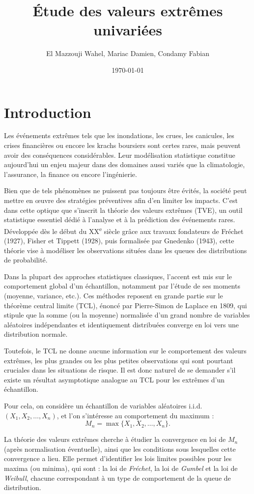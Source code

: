 \documentclass{article}
\title{Étude des valeurs extrêmes univariées}
\author{El Mazzouji Wahel, Mariac Damien, Condamy Fabian}
\date{\today}
\theoremstyle{plain}
\theoremstyle{definition}
\theoremstyle{plain}
\begin{document}
\maketitle 
\newpage
\tableofcontents 
\newpage
\section{Introduction}

Les événements extrêmes tels que les inondations, les crues, les canicules, les crises financières ou encore les krachs boursiers sont certes rares, mais peuvent avoir des conséquences considérables. Leur modélisation statistique constitue aujourd’hui un enjeu majeur dans des domaines aussi variés que la climatologie, l’assurance, la finance ou encore l’ingénierie.

Bien que de tels phénomènes ne puissent pas toujours être évités, la société peut mettre en œuvre des stratégies préventives afin d’en limiter les impacts. C’est dans cette optique que s’inscrit la théorie des valeurs extrêmes (TVE), un outil statistique essentiel dédié à l’analyse et à la prédiction des événements rares. Développée dès le début du XX\textsuperscript{e} siècle grâce aux travaux fondateurs de Fréchet (1927), Fisher et Tippett (1928), puis formalisée par Gnedenko (1943), cette théorie vise à modéliser les observations situées dans les queues des distributions de probabilité.

Dans la plupart des approches statistiques classiques, l’accent est mis sur le comportement global d’un échantillon, notamment par l’étude de ses moments (moyenne, variance, etc.). Ces méthodes reposent en grande partie sur le théorème central limite (TCL), énoncé par Pierre-Simon de Laplace en 1809, qui stipule que la somme (ou la moyenne) normalisée d’un grand nombre de variables aléatoires indépendantes et identiquement distribuées converge en loi vers une distribution normale.

Toutefois, le TCL ne donne aucune information sur le comportement des valeurs extrêmes, les plus grandes ou les plus petites observations qui sont pourtant cruciales dans les situations de risque. Il est donc naturel de se demander s’il existe un résultat asymptotique analogue au TCL pour les extrêmes d’un échantillon.

Pour cela, on considère un échantillon de variables aléatoires i.i.d. $(X_1, X_2, \dots, X_n)$, et l’on s’intéresse au comportement du maximum :
\[
M_n = \max\{X_1, X_2, \dots, X_n\}.
\]

La théorie des valeurs extrêmes cherche à étudier la convergence en loi de $M_n$ (après normalisation éventuelle), ainsi que les conditions sous lesquelles cette convergence a lieu. Elle permet d’identifier les lois limites possibles pour les maxima (ou minima), qui sont : la loi de \textit{Fréchet}, la loi de \textit{Gumbel} et la loi de \textit{Weibull}, chacune correspondant à un type de comportement de la queue de distribution.
\end{document}
